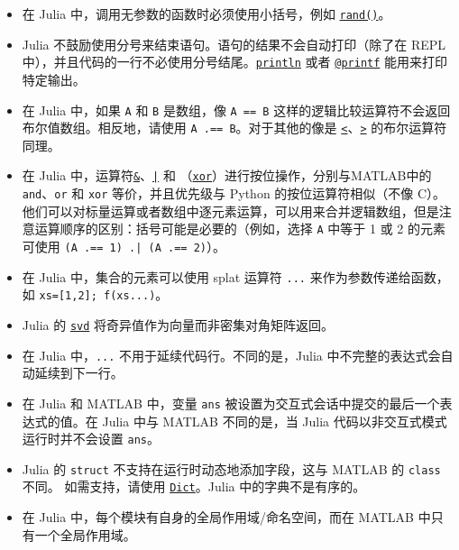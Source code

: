 \begin{itemize}
\item 在 Julia 中，调用无参数的函数时必须使用小括号，例如 \hyperlink{7668863842145012694}{\texttt{rand()}}。


\item Julia 不鼓励使用分号来结束语句。语句的结果不会自动打印（除了在 REPL 中），并且代码的一行不必使用分号结尾。\hyperlink{783803254548423222}{\texttt{println}} 或者 \hyperlink{13954719910189591998}{\texttt{@printf}} 能用来打印特定输出。


\item 在 Julia 中，如果 \texttt{A} 和 \texttt{B} 是数组，像 \texttt{A == B} 这样的逻辑比较运算符不会返回布尔值数组。相反地，请使用 \texttt{A .== B}。对于其他的像是 \hyperlink{702782232449268329}{\texttt{<}}、\hyperlink{8677991761303191103}{\texttt{>}} 的布尔运算符同理。


\item 在 Julia 中，运算符\hyperlink{1494761116451616317}{\texttt{\&}}、\hyperlink{9633687763646488853}{\texttt{|}} 和 \hyperlink{7071880015536674935}{\texttt{\unicodeveebar{}}}（\hyperlink{7071880015536674935}{\texttt{xor}}）进行按位操作，分别与MATLAB中的\texttt{and}、\texttt{or} 和 \texttt{xor} 等价，并且优先级与 Python 的按位运算符相似（不像 C）。他们可以对标量运算或者数组中逐元素运算，可以用来合并逻辑数组，但是注意运算顺序的区别：括号可能是必要的（例如，选择 \texttt{A} 中等于 1 或 2 的元素可使用 \texttt{(A .== 1) .| (A .== 2)}）。


\item 在 Julia 中，集合的元素可以使用 splat 运算符 \texttt{...} 来作为参数传递给函数，如 \texttt{xs=[1,2]; f(xs...)}。


\item Julia 的 \hyperlink{6661056220970412040}{\texttt{svd}} 将奇异值作为向量而非密集对角矩阵返回。


\item 在 Julia 中，\texttt{...} 不用于延续代码行。不同的是，Julia 中不完整的表达式会自动延续到下一行。


\item 在 Julia 和 MATLAB 中，变量 \texttt{ans} 被设置为交互式会话中提交的最后一个表达式的值。在 Julia 中与 MATLAB 不同的是，当 Julia 代码以非交互式模式运行时并不会设置 \texttt{ans}。


\item Julia 的 \texttt{struct} 不支持在运行时动态地添加字段，这与 MATLAB 的 \texttt{class} 不同。 如需支持，请使用 \hyperlink{3089397136845322041}{\texttt{Dict}}。Julia 中的字典不是有序的。


\item 在 Julia 中，每个模块有自身的全局作用域/命名空间，而在 MATLAB 中只有一个全局作用域。



\end{itemize}

